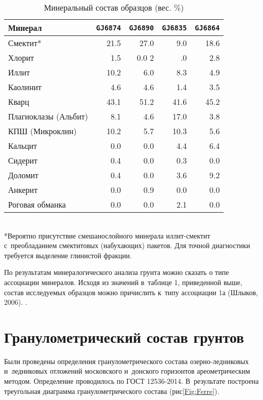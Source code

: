 \begin{table}[]
    \centering
    \small
    \caption{Минеральный состав образцов (вес. \%)} \label{tab:mineral}
    \begin{tabular}{@{}lrrrr@{}}
    \toprule
    Минерал & \texttt{GJ6874} &	\texttt{GJ6890} & \texttt{GJ6835} & \texttt{GJ6864}  \\ \midrule
    Смектит*	& 21.5	& 27.0	& 9.0	& 18.6 \\
    Хлорит	& 1.5	& 0.0	2& .0	& 2.8 \\
    Иллит	& 10.2	& 6.0	& 8.3	& 4.9 \\
    Каолинит	& 4.6	& 4.6	& 1.4	& 3.5 \\
    Кварц	& 43.1	& 51.2	& 41.6	& 45.2 \\
    Плагиоклазы (Альбит)	& 8.1	& 4.6	& 17.0	& 3.8 \\
    КПШ (Микроклин)	& 10.2	& 5.7	& 10.3	& 5.6 \\
    Кальцит	& 0.0	& 0.0	& 4.4	& 6.4 \\
    Сидерит	& 0.4	& 0.0	& 0.3	& 0.0 \\
    Доломит	& 0.4	& 0.0	& 3.6	& 9.2 \\
    Анкерит	& 0.0	& 0.9	& 0.0	& 0.0 \\
    Роговая обманка	& 0.0	& 0.0	& 2.1	& 0.0 \\ \bottomrule
    \end{tabular}
    \\ *Вероятно присутствие смешанослойного минерала иллит-смектит с~преобладанием смектитовых (набухающих) пакетов. Для точной диагностики требуется выделение глинистой фракции.
\end{table}
	
По результатам минералогического анализа грунта можно сказать о типе ассоциации минералов. Исходя из значений в~таблице 1, приведенной выше, состав исследуемых образцов можно причислить к~типу ассоциации 1а (Шлыков, 2006). \cite{Sh_2006}.


\section{Гранулометрический состав грунтов}

Были проведены определения гранулометрического состава озерно-ледниковых и~ледниковых отложений московского и~донского горизонтов ареометрическим методом. Определение проводилось по ГОСТ 12536-2014. В~результате построена треугольная диаграмма гранулометрического состава (рис\ref{Fig:Ferre}).

